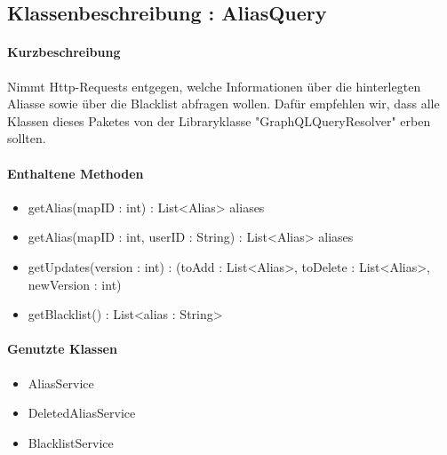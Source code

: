 \subsection{Klassenbeschreibung : AliasQuery}%
\paragraph*{Kurzbeschreibung}
Nimmt Http-Requests entgegen, welche Informationen über die hinterlegten Aliasse sowie über die Blacklist abfragen wollen.
Dafür empfehlen wir, dass alle Klassen dieses Paketes von der Libraryklasse "GraphQLQueryResolver" erben sollten.
\paragraph*{Enthaltene Methoden}
\begin{itemize}
    \item getAlias(mapID : int) : List<Alias> aliases
    \item getAlias(mapID : int, userID : String) : List<Alias> aliases
    \item getUpdates(version : int) : (toAdd : List<Alias>, toDelete : List<Alias>, newVersion : int)
    \item getBlacklist() : List<alias : String>
\end{itemize}
\paragraph*{Genutzte Klassen}
\begin{itemize}
    \item AliasService
    \item DeletedAliasService
    \item BlacklistService
\end{itemize}
